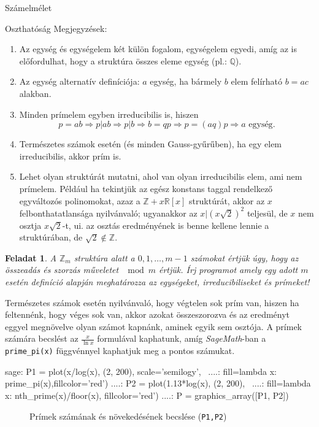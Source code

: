 \documentclass{amsbook}
\theoremstyle{mystyle}
\newtheorem{exercise}{Feladat}[part]
\begin{document}
\begin{part}{Számelmélet}
\begin{section}{Oszthatóság}
  Megjegyzések:
  \begin{enumerate}
    \item Az egység és egységelem két külön fogalom, egységelem egyedi, 
      amíg az is előfordulhat, hogy a struktúra összes eleme egység (pl.: $\mathbb{Q}$).
    \item Az egység alternatív definíciója: $a$ egység, ha bármely $b$ elem
      felírható $b=ac$ alakban.
    \item Minden prímelem egyben irreducibilis is, hiszen \[
        p = ab \Rightarrow p|ab \Rightarrow p|b \Rightarrow b = qp \Rightarrow
        p = (aq)p \Rightarrow a \text{ egység}.
      \]
    \item Természetes számok esetén (és minden Gauss-gy\H ur\H uben), ha egy
      elem irreducibilis, akkor prím is.
    \item Lehet olyan struktúrát mutatni, ahol van olyan irreducibilis elem,
      ami nem prímelem. Például ha tekintjük az egész konstans taggal rendelkező
      egyváltozós polinomokat, azaz a $\mathbb{Z} + x\mathbb{R}[x]$ struktúrát,
      akkor az $x$ felbonthatatlansága nyilvánvaló; ugyanakkor az
      $x|(x\sqrt{2})^2$ teljesül, de $x$ nem osztja $x\sqrt{2}$-t, ui. az 
      osztás eredményének is benne kellene lennie a struktúrában, de 
      $\sqrt{2}\notin\mathbb{Z}$. 
  \end{enumerate}

  \begin{exercise} A $\mathbb{Z}_m$ struktúra alatt a ${0,1,\dots, m-1}$
    számokat értjük úgy, hogy az összeadás és szorzás műveletet $\mod m$ értjük.
    Írj programot amely egy adott $m$ esetén definíció alapján meghatározza az 
    egységeket, irreducibiliseket és prímeket!
  \end{exercise}

  Természetes számok esetén nyilvánvaló, hogy végtelen sok prím van, hiszen ha
  feltennénk, hogy véges sok van, akkor azokat összeszorozva és az eredményt
  eggyel megnövelve olyan számot kapnánk, aminek egyik sem osztója.
  A prímek számára becslést az $\frac{x}{\ln x}$ formulával kaphatunk, amíg
  \emph{SageMath}-ban a \texttt{prime\_pi(x)} függvénnyel kaphatjuk meg a
  pontos számukat.
  \begin{sageexample}
    sage: P1 = plot(x/log(x), (2, 200), scale='semilogy', \
    ....:     fill=lambda x: prime_pi(x),fillcolor='red')
    ....: P2 = plot(1.13*log(x), (2, 200), \
    ....:     fill=lambda x: nth_prime(x)/floor(x), fillcolor='red')
    ....: P = graphics_array([P1, P2])
  \end{sageexample}
  \begin{figure}[ht]
    \centering
    \caption{Prímek számának és növekedésének becslése (\texttt{P1,P2}) }
  \end{figure}


\end{section}
\end{part}
\end{document}
